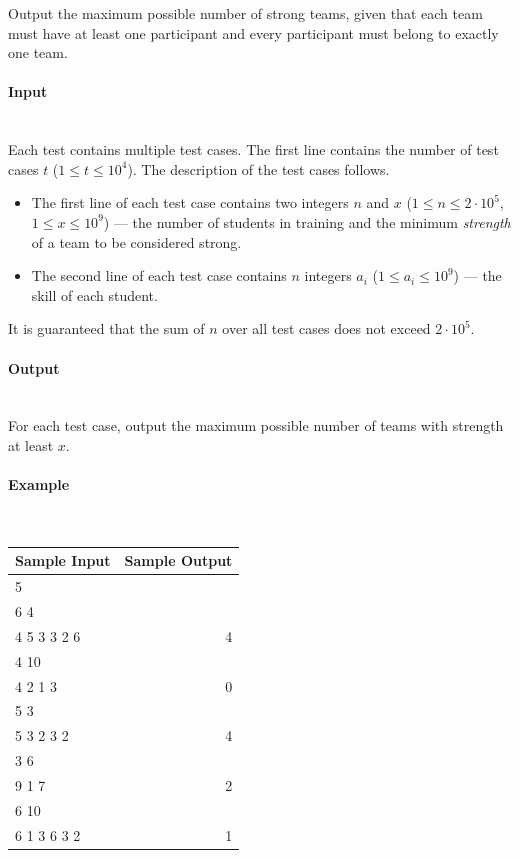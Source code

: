 \documentclass{article}
\begin{document}
Output the maximum possible number of strong teams, given that each team must have at least one participant and every participant must belong to exactly one team.

\paragraph{Input} \mbox{} \\

Each test contains multiple test cases. The first line contains the number of test cases $t$ ($1 \le t \le 10^4$). The description of the test cases follows.

\begin{itemize}[leftmargin=*]
    \item The first line of each test case contains two integers $n$ and $x$ ($1 \le n \le 2 \cdot 10^5$, $1 \le x \le 10^9$) — the number of students in training and the minimum \textit{strength} of a team to be considered strong.
    \item The second line of each test case contains $n$ integers $a_i$ ($1 \le a_i \le 10^9$) — the skill of each student.
\end{itemize}

It is guaranteed that the sum of $n$ over all test cases does not exceed $2 \cdot 10^5$.


\paragraph{Output}\mbox{} \\

For each test case, output the maximum possible number of teams with strength at least $x$.

\paragraph{Example}\mbox{} \\

\begin{table}[h]
    \centering
    \begin{tabular}{|l|r|}
        \hline
        \rowcolor{gray!30}  %
        \textbf{Sample Input} & \textbf{Sample Output} \\
        \hline
        5 & \\
        6 4 & \\
        4 5 3 3 2 6 & 4 \\
        4 10 & \\
        4 2 1 3 & 0 \\
        5 3 & \\
        5 3 2 3 2 & 4 \\
        3 6 & \\
        9 1 7 & 2 \\
        6 10 & \\
        6 1 3 6 3 2 & 1 \\
        \hline
    \end{tabular}
\end{table}
\end{document}
